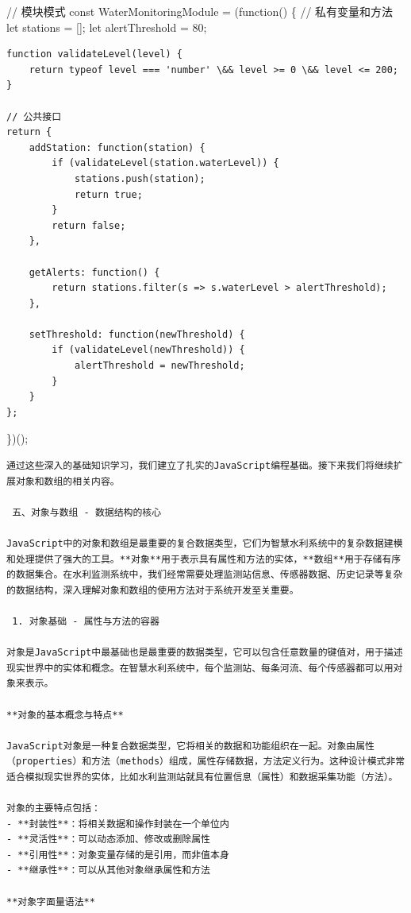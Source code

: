 {// 模块模式 const WaterMonitoringModule = (function() \{ // 私有变量和方法 let stations = {[}{]}; let alertThreshold = 80;

\begin{verbatim}
function validateLevel(level) {
    return typeof level === 'number' \&& level >= 0 \&& level <= 200;
}

// 公共接口
return {
    addStation: function(station) {
        if (validateLevel(station.waterLevel)) {
            stations.push(station);
            return true;
        }
        return false;
    },
    
    getAlerts: function() {
        return stations.filter(s => s.waterLevel > alertThreshold);
    },
    
    setThreshold: function(newThreshold) {
        if (validateLevel(newThreshold)) {
            alertThreshold = newThreshold;
        }
    }
};
\end{verbatim}

\})();

\begin{lstlisting}
通过这些深入的基础知识学习，我们建立了扎实的JavaScript编程基础。接下来我们将继续扩展对象和数组的相关内容。

 五、对象与数组 - 数据结构的核心

JavaScript中的对象和数组是最重要的复合数据类型，它们为智慧水利系统中的复杂数据建模和处理提供了强大的工具。**对象**用于表示具有属性和方法的实体，**数组**用于存储有序的数据集合。在水利监测系统中，我们经常需要处理监测站信息、传感器数据、历史记录等复杂的数据结构，深入理解对象和数组的使用方法对于系统开发至关重要。

 1. 对象基础 - 属性与方法的容器

对象是JavaScript中最基础也是最重要的数据类型，它可以包含任意数量的键值对，用于描述现实世界中的实体和概念。在智慧水利系统中，每个监测站、每条河流、每个传感器都可以用对象来表示。

**对象的基本概念与特点**

JavaScript对象是一种复合数据类型，它将相关的数据和功能组织在一起。对象由属性（properties）和方法（methods）组成，属性存储数据，方法定义行为。这种设计模式非常适合模拟现实世界的实体，比如水利监测站就具有位置信息（属性）和数据采集功能（方法）。

对象的主要特点包括：
- **封装性**：将相关数据和操作封装在一个单位内
- **灵活性**：可以动态添加、修改或删除属性
- **引用性**：对象变量存储的是引用，而非值本身
- **继承性**：可以从其他对象继承属性和方法

**对象字面量语法**


\end{lstlisting}}
